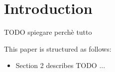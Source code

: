 \section{Introduction}

TODO spiegare perchè tutto

This paper is structured as follows:
\begin{itemize}
	\item Section 2 describes TODO ...
\end{itemize}
